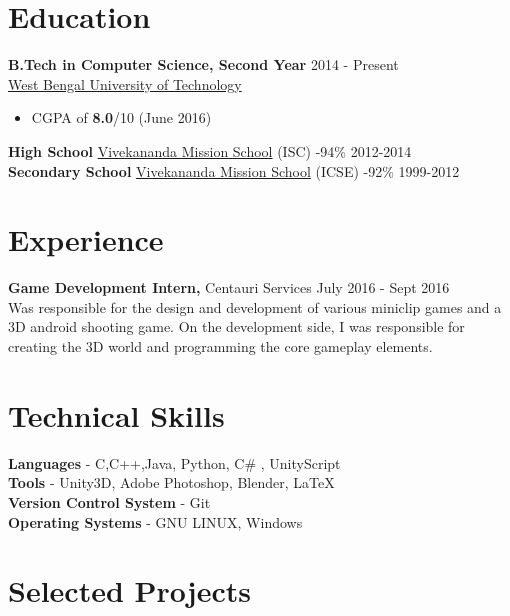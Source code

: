 \documentclass[margin, centered]{res}
\begin{document}
\begin{resume}

\section{Education}
\textbf{B.Tech in Computer Science, Second Year} \hfill 2014 - Present\\
\href{http://www.wbut.ac.in/}{West Bengal University of Technology}

\begin{itemize}
 \item CGPA of \textbf{8.0}/10 (June 2016)
\end{itemize}
\textbf{High School} \href{http://www.vmskolkata.org/}{Vivekananda Mission School} (ISC) -94\% \hfill 2012-2014\\
\textbf{Secondary School} \href{http://www.vmskolkata.org/}{Vivekananda Mission School} (ICSE) -92\% \hfill 1999-2012

\section{Experience}
\textbf{Game Development Intern,} Centauri Services \hfill July 2016 - Sept 2016\\
Was responsible for the design and development of various miniclip games and a 3D android shooting game. On the development side, I was responsible for creating the 3D world and programming the core gameplay elements.
\section{Technical Skills}
\textbf{Languages} - C,C++,Java, Python, C\# , UnityScript \\
\textbf{Tools} - Unity3D, Adobe Photoshop, Blender, \LaTeX \\
\textbf{Version Control System} - Git \\
\textbf{Operating Systems} - GNU LINUX, Windows
\section{Selected Projects}


\end{resume}
\end{document}
